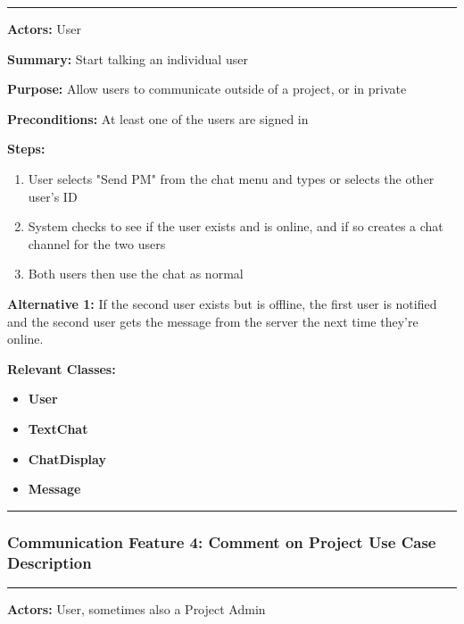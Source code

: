 \documentclass[twoside,letterpaper]{article}
\begin{document}
\vspace{2pt}
\hrule
\vspace{8pt}
\textbf{Actors:} User \newline

\noindent\textbf{Summary:} Start talking an individual user \newline

\noindent\textbf{Purpose:} Allow users to communicate outside of a project, or in private \newline

\noindent\textbf{Preconditions:} At least one of the users are signed in \newline

\noindent\textbf{Steps:} \begin{enumerate}
	\item User selects "Send PM" from the chat menu and types or selects the other user's ID
	\item System checks to see if the user exists and is online, and if so creates a chat channel for the two users
	\item Both users then use the chat as normal
\end{enumerate}
\noindent\textbf{Alternative 1:} If the second user exists but is offline, the first user is notified and the second user gets the message from the server the next time they're online. \newline


\noindent\textbf{Relevant Classes:}
\begin{itemize}
	\item \textbf{User}
	\item \textbf{TextChat}
	\item \textbf{ChatDisplay}
	\item \textbf{Message}
\end{itemize}
\hrule
\newpage

\subsubsection[Communication Feature 4: Comment on Project Use Case Description]{\rmfamily\bfseries\color{black}
	Communication Feature 4: Comment on Project Use Case Description}
\hypertarget{RefHeading22059017292}{}

\vspace{2pt}
\hrule
\vspace{8pt}
\textbf{Actors:} User, sometimes also a Project Admin \newline
\end{document}
